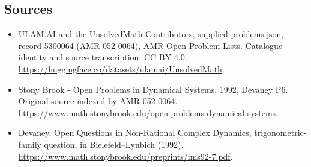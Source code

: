 \documentclass[11pt,a4paper]{article}
\begin{document}
\subsection{Sources}
\begin{itemize}
\item[S1] ULAM.AI and the UnsolvedMath Contributors, supplied problems.json, record 5300064 (AMR-052-0064), AMR Open Problem Lists. Catalogue identity and source transcription; CC BY 4.0.
\url{https://huggingface.co/datasets/ulamai/UnsolvedMath}.
\item[S2] Stony Brook - Open Problems in Dynamical Systems, 1992, Devaney P6. Original source indexed by AMR-052-0064.
\url{https://www.math.stonybrook.edu/open-problems-dynamical-systems}.
\item[S3] Devaney, Open Questions in Non-Rational Complex Dynamics, trigonometric-family question, in Bielefeld–Lyubich (1992).
\url{https://www.math.stonybrook.edu/preprints/ims92-7.pdf}.
\end{itemize}
\end{document}
